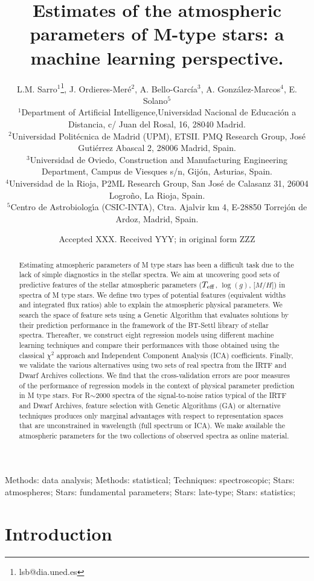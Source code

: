 \documentclass[a4paper,fleqn,usenatbib]{mnras}
\title[Estimating the atmospheric parameters of M-type
  stars]{Estimates of the atmospheric parameters of M-type stars: a
  machine learning perspective.}
\author[L. M. Sarro et al.]  {
  L.M. Sarro$^{1}$\thanks{lsb@dia.uned.es}, J. Ordieres-Mer\'e$^{2}$,
  A. Bello-Garc\'ia$^{3}$, A. Gonz\'alez-Marcos$^{4}$, E. Solano$^{5}$
  \\ $^{1}$Department of Artificial Intelligence,Universidad Nacional
  de Educaci\'{o}n a Distancia, c/ Juan del Rosal, 16, 28040
  Madrid.\\ $^{2}$Universidad Polit\'{e}cnica de Madrid (UPM),
  ETSII. PMQ Research Group, Jos\'{e} Guti\'{e}rrez Abascal 2, 28006
  Madrid, Spain. \\ $^{3}$Universidad de Oviedo, Construction and
  Manufacturing Engineering Department, Campus de Viesques s/n,
  Gij\'{o}n, Asturias, Spain. \\ $^{4}$Universidad de la Rioja, P2ML
  Research Group, San Jos\'{e} de Calasanz 31, 26004 Logro\~{n}o, La
  Rioja, Spain. \\ $^{5}$Centro de Astrobiolog\'{\i}a (CSIC-INTA),
  Ctra. Ajalvir km 4, E-28850 Torrej\'{o}n de Ardoz, Madrid,
  Spain.\\ } \date{Accepted XXX. Received YYY; in original form ZZZ}
\newcommand{\defindent}{\setlength{\parindent}{4ex}}
\begin{document}
 
\label{firstpage}
\pagerange{\pageref{firstpage}--\pageref{lastpage}}
\maketitle

\begin{abstract}
    Estimating atmospheric parameters of M type stars has been a
    difficult task due to the lack of simple diagnostics in the
    stellar spectra.  We aim at uncovering good sets of predictive
    features of the stellar atmospheric parameters ($T_{\rm eff}$,
    $\log(g)$, [$M/H$]) in spectra of M type stars. We define two
    types of potential features (equivalent widths and integrated flux
    ratios) able to explain the atmospheric physical parameters. We
    search the space of feature sets using a Genetic Algorithm that
    evaluates solutions by their prediction performance in the
    framework of the BT-Settl library of stellar spectra. Thereafter,
    we construct eight regression models using different machine
    learning techniques and compare their performances with those
    obtained using the classical $\chi^2$ approach and Independent
    Component Analysis (ICA) coefficients. Finally, we validate the
    various alternatives using two sets of real spectra from the IRTF
    and Dwarf Archives collections.  We find that the cross-validation
    errors are poor measures of the performance of regression models
    in the context of physical parameter prediction in M type
    stars. For R$\sim$2000 spectra of the signal-to-noise ratios
    typical of the IRTF and Dwarf Archives, feature selection with
    Genetic Algorithms (GA) or alternative techniques produces only
    marginal advantages with respect to representation spaces that are
    unconstrained in wavelength (full spectrum or ICA). We make
    available the atmospheric parameters for the two collections of
    observed spectra as online material.
    
\end{abstract}


\begin{keywords}
Methods: data analysis; Methods: statistical;
     Techniques: spectroscopic; Stars: atmospheres; Stars: fundamental
     parameters; Stars: late-type; Stars: statistics;
\end{keywords}

%

\defindent{}

\section{Introduction}
\label{sec:intro}

\end{document}
